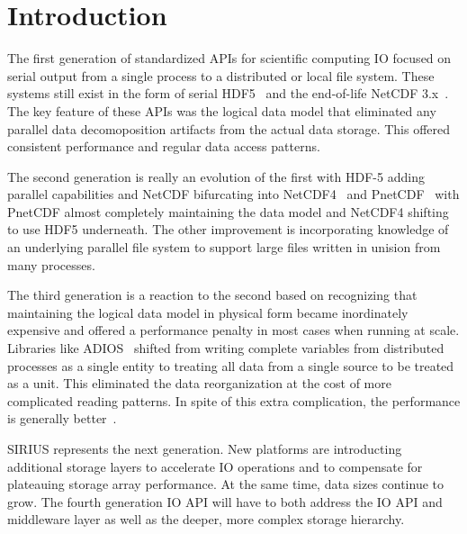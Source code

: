 \documentclass{sig-alt-gov2}
\begin{document}


\section{Introduction}

The first generation of standardized APIs for scientific computing IO focused
on serial output from a single process to a distributed or local file system.
These systems still exist in the form of serial HDF5~\cite{hdf5} and the
end-of-life NetCDF 3.x~\cite{netcdf}. The key feature of these APIs was the
logical data model that eliminated any parallel data decomoposition artifacts
from the actual data storage. This offered consistent performance and regular
data access patterns.

The second generation is really an evolution of the first with HDF-5 adding
parallel capabilities and NetCDF bifurcating into NetCDF4~\cite{netcdf4} and
PnetCDF~\cite{pnetcdf} with PnetCDF almost completely maintaining the data
model and NetCDF4 shifting to use HDF5 underneath. The other improvement is
incorporating knowledge of an underlying parallel file system to support large
files written in unision from many processes.

The third generation is a reaction to the second based on recognizing that
maintaining the logical data model in physical form became inordinately
expensive and offered a performance penalty in most cases when running at
scale. Libraries like ADIOS~\cite{adios} shifted from writing complete
variables from distributed processes as a single entity to treating all data
from a single source to be treated as a unit. This eliminated the data
reorganization at the cost of more complicated reading patterns. In spite of
this extra complication, the performance is generally
better~\cite{six-degrees}.

SIRIUS represents the next generation. New platforms are introducting
additional storage layers to accelerate IO operations and to compensate for
plateauing storage array performance. At the same time, data sizes continue
to grow. The fourth generation IO API will have to both address the IO API
and middleware layer as well as the deeper, more complex storage hierarchy.
\end{document}
